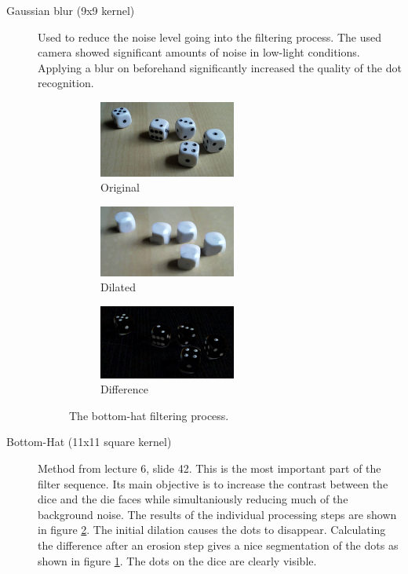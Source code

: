 \begin{description}
\item[Gaussian blur (9x9 kernel)] Used to reduce the noise level going into the filtering process. The used camera showed significant amounts of noise in low-light conditions. Applying a blur on beforehand significantly increased the quality of the dot recognition.

\begin{figure}
	\centering
	\begin{subfigure}[b]{45mm}
		\includegraphics[width=45mm]{images/dies/original.png}
		\caption{Original}
	\end{subfigure}
	\hspace{0.5cm}
	\begin{subfigure}[b]{45mm}
		\includegraphics[width=45mm]{images/dies/dilated.png}
		\caption{Dilated}
	\end{subfigure}
	\hspace{0.5cm}
	\begin{subfigure}[b]{45mm}
		\includegraphics[width=45mm]{images/dies/difference.png}
		\caption{Difference}
		\label{fig:imgdiff}
	\end{subfigure}

	\caption{The bottom-hat filtering process.}
	\label{fig:bottomhat}
\end{figure}

\item[Bottom-Hat (11x11 square kernel)] Method from lecture 6, slide 42. This is the most important part of the filter sequence. Its main objective is to increase the contrast between the dice and the die faces while simultaniously reducing much of the background noise. The results of the individual processing steps are shown in figure \ref{fig:bottomhat}. The initial dilation causes the dots to disappear. Calculating the difference after an erosion step gives a nice segmentation of the dots as shown in figure \ref{fig:imgdiff}. The dots on the dice are clearly visible.


\end{description}
